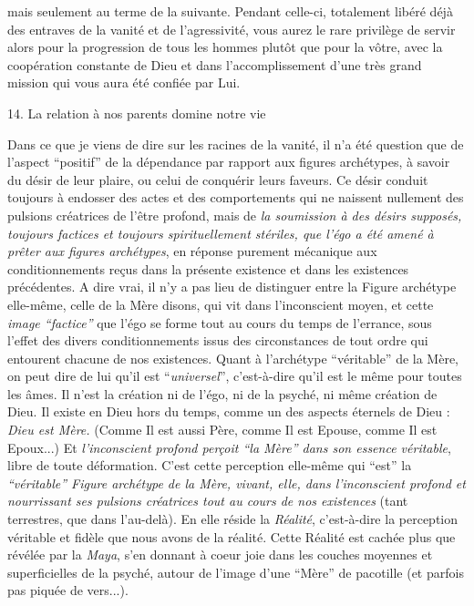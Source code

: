 
mais seulement au terme de la suivante. Pendant celle-ci, totalement libéré déjà des entraves de la vanité et de l'agressivité, vous aurez le rare privilège de servir alors pour la progression de tous les hommes plutôt que pour la vôtre, avec la coopération constante de Dieu et dans l'accomplissement d'une très grand mission qui vous aura été confiée par Lui.

14. La relation à nos parents domine notre vie

Dans ce que je viens de dire sur les racines de la vanité, il n'a été question que de l'aspect ``positif'' de la dépendance par rapport aux figures archétypes, à savoir du désir de leur plaire, ou celui de conquérir leurs faveurs. Ce désir conduit toujours à endosser des actes et des comportements qui ne naissent nullement des pulsions créatrices de l'être profond, mais de \textit{la soumission à des désirs supposés, toujours factices et toujours spirituellement stériles, que l'égo a été amené à prêter aux figures archétypes}, en réponse purement mécanique aux conditionnements reçus dans la présente existence et dans les existences précédentes. A dire vrai, il n'y a pas lieu de distinguer entre la Figure archétype elle-même, celle de la Mère disons, qui vit dans l'inconscient moyen, et cette \textit{image ``factice''} que l'égo se forme tout au cours du temps de l'errance, sous l'effet des divers conditionnements issus des circonstances de tout ordre qui entourent chacune de nos existences. Quant à l'archétype ``véritable'' de la Mère, on peut dire de lui qu'il est ``\textit{universel}'', c'est-à-dire qu'il est le même pour toutes les âmes. Il n'est la création ni de l'égo, ni de la psyché, ni même création de Dieu. Il existe en Dieu hors du temps, comme un des aspects éternels de Dieu : \textit{Dieu est Mère.} (Comme Il est aussi Père, comme Il est Epouse, comme Il est Epoux...) Et \textit{l'inconscient profond perçoit ``la Mère'' dans son essence véritable}, libre de toute déformation. C'est cette perception elle-même qui ``est'' la \textit{``véritable'' Figure archétype de la Mère, vivant, elle, dans l'inconscient profond et nourrissant ses pulsions créatrices tout au cours de nos existences} (tant terrestres, que dans l'au-delà). En elle réside la \textit{Réalité}, c'est-à-dire la perception véritable et fidèle que nous avons de la réalité. Cette Réalité est cachée plus que révélée par la \textit{Maya}, s'en donnant à coeur joie dans les couches moyennes et superficielles de la psyché, autour de l'image d'une ``Mère'' de pacotille (et parfois pas piquée de vers...).

